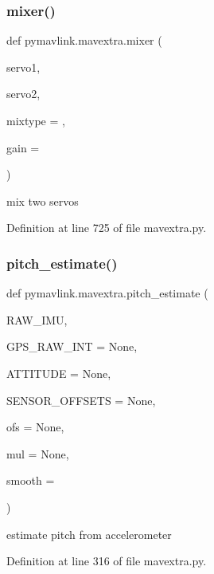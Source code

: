 \subsubsection{\texorpdfstring{mixer()}{mixer()}}
{\footnotesize\ttfamily def pymavlink.\+mavextra.\+mixer (\begin{DoxyParamCaption}\item[{}]{servo1,  }\item[{}]{servo2,  }\item[{}]{mixtype = {},  }\item[{}]{gain = {} }\end{DoxyParamCaption})}

\begin{DoxyVerb}mix two servos\end{DoxyVerb}
 

Definition at line 725 of file mavextra.\+py.

\mbox{\label{namespacepymavlink_1_1mavextra_a571222d19bb4574669698dcb01912fb7}} 
\subsubsection{\texorpdfstring{pitch\_estimate()}{pitch\_estimate()}}
{\footnotesize\ttfamily def pymavlink.\+mavextra.\+pitch\+\_\+estimate (\begin{DoxyParamCaption}\item[{}]{R\+A\+W\+\_\+\+I\+MU,  }\item[{}]{G\+P\+S\+\_\+\+R\+A\+W\+\_\+\+I\+NT = {\ttfamily None},  }\item[{}]{A\+T\+T\+I\+T\+U\+DE = {\ttfamily None},  }\item[{}]{S\+E\+N\+S\+O\+R\+\_\+\+O\+F\+F\+S\+E\+TS = {\ttfamily None},  }\item[{}]{ofs = {\ttfamily None},  }\item[{}]{mul = {\ttfamily None},  }\item[{}]{smooth = {} }\end{DoxyParamCaption})}

\begin{DoxyVerb}estimate pitch from accelerometer\end{DoxyVerb}
 

Definition at line 316 of file mavextra.\+py.

